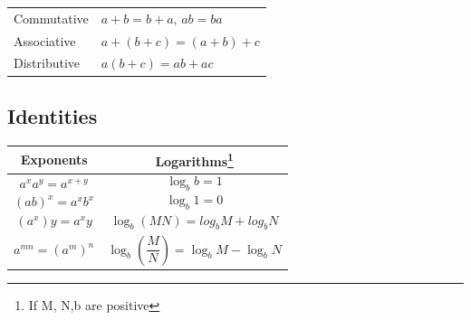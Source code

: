 \documentclass[
]{book}
\begin{document}
\begin{longtable}[]{@{}ll@{}}
\toprule
\endhead
Commutative & \( a+b = b+a ,\, ab = ba \)\tabularnewline
Associative & \(a+(b+c) = (a+b)+c\)\tabularnewline
Distributive & \(a(b+c) = ab+ac\)\tabularnewline
\bottomrule
\end{longtable}

\hypertarget{identities}{%
\subsection{Identities}\label{identities}}

\begin{longtable}[]{@{}cc@{}}
\toprule
\begin{minipage}[b]{0.47\columnwidth}\centering
Exponents\strut
\end{minipage} & \begin{minipage}[b]{0.47\columnwidth}\centering
Logarithms\footnote{If M, N,b are positive}\strut
\end{minipage}\tabularnewline
\midrule
\endhead
\begin{minipage}[t]{0.47\columnwidth}\centering
\[a^x a^y = a^{x+y}\]\strut
\end{minipage} & \begin{minipage}[t]{0.47\columnwidth}\centering
\[\log_b{b} = 1\]\strut
\end{minipage}\tabularnewline
\begin{minipage}[t]{0.47\columnwidth}\centering
\[\left( ab \right) ^x = a^x b^x \]\strut
\end{minipage} & \begin{minipage}[t]{0.47\columnwidth}\centering
\[\log_b{1} = 0\]\strut
\end{minipage}\tabularnewline
\begin{minipage}[t]{0.47\columnwidth}\centering
\[\left( a^x \right) y = a^xy \]\strut
\end{minipage} & \begin{minipage}[t]{0.47\columnwidth}\centering
\[ \log_b \left( MN \right) = log_b{M} + log_b{N}\]\strut
\end{minipage}\tabularnewline
\begin{minipage}[t]{0.47\columnwidth}\centering
\[a^{mn}  = \left( a^m \right) ^n \]\strut
\end{minipage} & \begin{minipage}[t]{0.47\columnwidth}\centering
\[\log_b \left( \frac{M}{N} \right) = \log_b{M} - \log_b{N}\]\strut
\end{minipage}\tabularnewline

\end{longtable}
\end{document}
